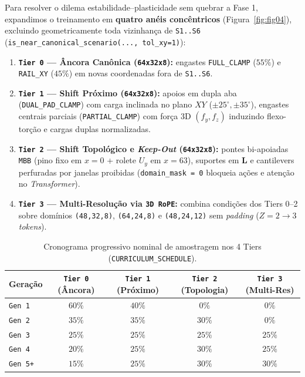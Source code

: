 \documentclass[11pt,a4paper]{article}
\begin{document}
Para resolver o dilema estabilidade--plasticidade sem quebrar a Fase 1, expandimos o treinamento em \textbf{quatro anéis concêntricos} (Figura~\ref{fig:fig04}), excluindo geometricamente toda vizinhança de \texttt{S1..S6} (\texttt{is\_near\_canonical\_scenario(..., tol\_xy=1)}):
\begin{enumerate}
\item \textbf{\texttt{Tier 0} — Âncora Canônica (\texttt{64x32x8}):} engastes \texttt{FULL\_CLAMP} ($55\%$) e \texttt{RAIL\_XY} ($45\%$) em novas coordenadas fora de \texttt{S1..S6}.
\item \textbf{\texttt{Tier 1} — Shift Próximo (\texttt{64x32x8}):} apoios em dupla aba (\texttt{DUAL\_PAD\_CLAMP}) com carga inclinada no plano $XY$ ($\pm 25^\circ, \pm 35^\circ$), engastes centrais parciais (\texttt{PARTIAL\_CLAMP}) com força 3D $(f_y, f_z)$ induzindo flexo-torção e cargas duplas normalizadas.
\item \textbf{\texttt{Tier 2} — Shift Topológico e \emph{Keep-Out} (\texttt{64x32x8}):} pontes bi-apoiadas \texttt{MBB} (pino fixo em $x=0$ + rolete $U_y$ em $x=63$), suportes em \textbf{L} e cantilevers perfuradas por janelas proibidas (\texttt{domain\_mask = 0} bloqueia ações e atenção no \emph{Transformer}).
\item \textbf{\texttt{Tier 3} — Multi-Resolução via \texttt{3D RoPE}:} combina condições dos Tiers 0--2 sobre domínios \texttt{(48,32,8)}, \texttt{(64,24,8)} e \texttt{(48,24,12)} sem \emph{padding} ($Z=2 \to 3$ \emph{tokens}).
\end{enumerate}

\begin{table}[htbp]
\centering
\caption{Cronograma progressivo nominal de amostragem nos 4 Tiers (\texttt{CURRICULUM\_SCHEDULE}).}
\label{tab:curriculum-sched}
\small
\begin{tabular}{@{}lcccc@{}}
\toprule
Geração & \texttt{Tier 0} (Âncora) & \texttt{Tier 1} (Próximo) & \texttt{Tier 2} (Topologia) & \texttt{Tier 3} (Multi-Res) \\
\midrule
\texttt{Gen 1} & $60\%$ & $40\%$ & $0\%$ & $0\%$ \\
\texttt{Gen 2} & $35\%$ & $35\%$ & $30\%$ & $0\%$ \\
\texttt{Gen 3} & $25\%$ & $25\%$ & $25\%$ & $25\%$ \\
\texttt{Gen 4} & $20\%$ & $25\%$ & $30\%$ & $25\%$ \\
\texttt{Gen 5+} & $15\%$ & $25\%$ & $30\%$ & $30\%$ \\
\bottomrule
\end{tabular}
\end{table}
\end{document}
